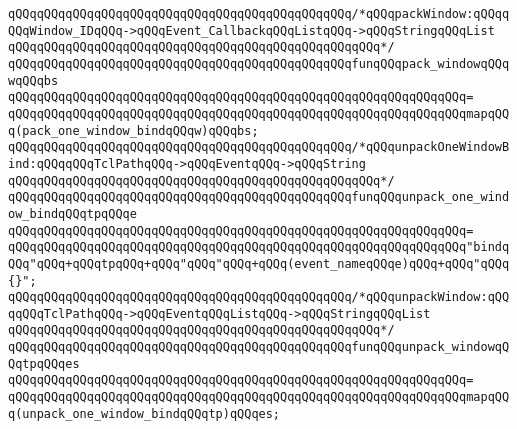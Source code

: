 \verb|qQQqqQQqqQQqqQQqqQQqqQQqqQQqqQQqqQQqqQQqqQQqqQQq/*qQQqpackWindow:qQQqqQQqWindow_IDqQQq->qQQqEvent_CallbackqQQqListqQQq->qQQqStringqQQqList|\newline
\verb|qQQqqQQqqQQqqQQqqQQqqQQqqQQqqQQqqQQqqQQqqQQqqQQqqQQq*/|\newline
\verb|qQQqqQQqqQQqqQQqqQQqqQQqqQQqqQQqqQQqqQQqqQQqqQQqfunqQQqpack_windowqQQqwqQQqbs|\newline
\verb|qQQqqQQqqQQqqQQqqQQqqQQqqQQqqQQqqQQqqQQqqQQqqQQqqQQqqQQqqQQqqQQq=|\newline
\verb|qQQqqQQqqQQqqQQqqQQqqQQqqQQqqQQqqQQqqQQqqQQqqQQqqQQqqQQqqQQqqQQqmapqQQq(pack_one_window_bindqQQqw)qQQqbs;|\newline
\newline
\newline
\newline
\verb|qQQqqQQqqQQqqQQqqQQqqQQqqQQqqQQqqQQqqQQqqQQqqQQq/*qQQqunpackOneWindowBind:qQQqqQQqTclPathqQQq->qQQqEventqQQq->qQQqString|\newline
\verb|qQQqqQQqqQQqqQQqqQQqqQQqqQQqqQQqqQQqqQQqqQQqqQQqqQQq*/|\newline
\verb|qQQqqQQqqQQqqQQqqQQqqQQqqQQqqQQqqQQqqQQqqQQqqQQqfunqQQqunpack_one_window_bindqQQqtpqQQqe|\newline
\verb|qQQqqQQqqQQqqQQqqQQqqQQqqQQqqQQqqQQqqQQqqQQqqQQqqQQqqQQqqQQqqQQq=|\newline
\verb|qQQqqQQqqQQqqQQqqQQqqQQqqQQqqQQqqQQqqQQqqQQqqQQqqQQqqQQqqQQqqQQq"bindqQQq"qQQq+qQQqtpqQQq+qQQq"qQQq"qQQq+qQQq(event_nameqQQqe)qQQq+qQQq"qQQq{}";|\newline
\newline
\newline
\newline
\verb|qQQqqQQqqQQqqQQqqQQqqQQqqQQqqQQqqQQqqQQqqQQqqQQq/*qQQqunpackWindow:qQQqqQQqTclPathqQQq->qQQqEventqQQqListqQQq->qQQqStringqQQqList|\newline
\verb|qQQqqQQqqQQqqQQqqQQqqQQqqQQqqQQqqQQqqQQqqQQqqQQqqQQq*/|\newline
\verb|qQQqqQQqqQQqqQQqqQQqqQQqqQQqqQQqqQQqqQQqqQQqqQQqfunqQQqunpack_windowqQQqtpqQQqes|\newline
\verb|qQQqqQQqqQQqqQQqqQQqqQQqqQQqqQQqqQQqqQQqqQQqqQQqqQQqqQQqqQQqqQQq=|\newline
\verb|qQQqqQQqqQQqqQQqqQQqqQQqqQQqqQQqqQQqqQQqqQQqqQQqqQQqqQQqqQQqqQQqmapqQQq(unpack_one_window_bindqQQqtp)qQQqes;|\newline
\newline
\newline
\newline
